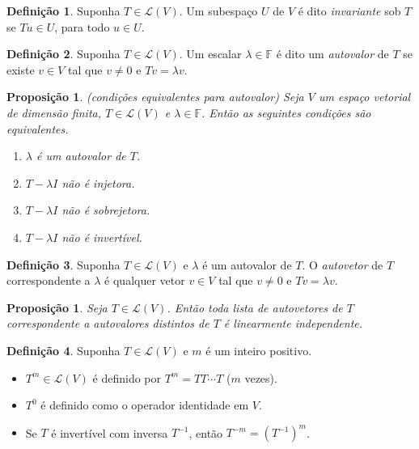 \documentclass[12pt]{article}
\theoremstyle{plain}
\newtheorem{prop}[thm]{Proposição}
\theoremstyle{definition}
\newtheorem{defn}{Definição}[section]
\theoremstyle{remark}
\begin{document}
\begin{defn}
    Suponha \(T \in \mathcal{L}(V)\). Um subespaço \(U\) de \(V\) é dito \emph{invariante} sob \(T\) se \(Tu \in U\), para todo \(u \in U\).
\end{defn}

\begin{defn}
    Suponha \(T \in \mathcal{L}(V)\). Um escalar \(\lambda \in \mathbb{F}\) é dito um \emph{autovalor} de \(T\) se existe \(v \in V\) tal que \(v \neq 0\) e \(Tv = \lambda v\). 
\end{defn}

\begin{prop} (condições equivalentes para autovalor)
    Seja \(V\) um espaço vetorial de dimensão finita, \(T \in \mathcal{L}(V)\) e \(\lambda \in \mathbb{F}\). Então as seguintes condições são equivalentes.
    \begin{enumerate}
        \item[\textup{(a)}] \(\lambda\) é um autovalor de \(T\).
        \item[\textup{(b)}] \(T - \lambda I\) não é injetora.
        \item[\textup{(c)}] \(T - \lambda I\) não é sobrejetora.
        \item[\textup{(d)}] \(T - \lambda I\) não é invertível.
    \end{enumerate}
\end{prop}

\begin{defn}
    Suponha \(T \in \mathcal{L}(V)\) e \(\lambda\) é um autovalor de \(T\). O \emph{autovetor} de \(T\) correspondente a \(\lambda\) é qualquer vetor \(v \in V\) tal que \(v \neq 0\) e \(Tv = \lambda v\).
\end{defn}

\begin{prop}
    Seja \(T \in \mathcal{L}(V)\). Então toda lista de autovetores de \(T\) correspondente a autovalores distintos de \(T\) é linearmente independente.
\end{prop}

\begin{defn}
    Suponha \(T \in \mathcal{L}(V)\) e \(m\) é um inteiro positivo.
    \begin{itemize}
        \item \(T^m \in \mathcal{L}(V)\) é definido por \(T^m = T T \cdots T\) (\(m\) vezes).
        \item \(T^0\) é definido como o operador identidade em \(V\).
        \item Se \(T\) é invertível com inversa \(T^{-1}\), então \(T^{-m} = (T^{-1})^m\).
    \end{itemize}
\end{defn}
\end{document}
